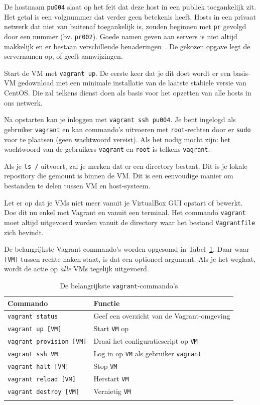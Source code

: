 De hostnaam \texttt{pu004} slaat op het feit dat deze host in een publiek toegankelijk zit. Het getal is een volgnummer dat verder geen betekenis heeft. Hosts in een privaat netwerk dat niet van buitenaf toegankelijk is, zouden beginnen met \texttt{pr} gevolgd door een nummer (bv. \texttt{pr002}). Goede namen geven aan servers is niet altijd makkelijk en er bestaan verschillende benaderingen~\autocite{Mytton2015,mnxio}. De gekozen opgave legt de servernamen op, of geeft aanwijzingen.

Start de VM met \texttt{vagrant\ up}. De eerste keer dat je dit doet wordt er een basis-VM gedownload met een minimale installatie van de laatste stabiele versie van CentOS. Die zal telkens dienst doen als basis voor het opzetten van alle hosts in ons netwerk.

Na opstarten kan je inloggen met \texttt{vagrant\ ssh\ pu004}. Je bent ingelogd als gebruiker \texttt{vagrant} en kan commando's uitvoeren met \texttt{root}-rechten door er \texttt{sudo} voor te plaatsen (geen wachtwoord vereist). Als het nodig mocht zijn: het wachtwoord van de gebruikers \texttt{vagrant} en \texttt{root} is telkens \texttt{vagrant}.

Als je \texttt{ls\ /} uitvoert, zal je merken dat er een directory  bestaat. Dit is je lokale repository die gemount is binnen de VM. Dit is een eenvoudige manier om bestanden te delen tussen VM en host-systeem.

Let er op dat je VMs niet meer vanuit je VirtualBox GUI opstart of bewerkt. Doe dit nu enkel met Vagrant en vanuit een terminal. Het commando \texttt{vagrant} moet altijd uitgevoerd worden vanuit de directory waar het bestand \texttt{Vagrantfile} zich bevindt.

De belangrijkste Vagrant commando's worden opgesomd in Tabel~\ref{tab:vagrant-commandos}. Daar waar \texttt{[VM]} tussen rechte haken staat, is dat een optioneel argument. Als je het weglaat, wordt de actie op \emph{alle} VMs tegelijk uitgevoerd.

\begin{longtable}{@{}ll@{}}
  \toprule
  Commando & Functie\tabularnewline
  \midrule
  \endhead
  \texttt{vagrant\ status} & Geef een overzicht van de Vagrant-omgeving\tabularnewline
  \texttt{vagrant\ up\ [VM]} & Start \texttt{VM} op\tabularnewline
  \texttt{vagrant\ provision\ [VM]} & Draai het configuratiescript op \texttt{VM}\tabularnewline
  \texttt{vagrant\ ssh\ VM} & Log in op \texttt{VM} als gebruiker \texttt{vagrant}\tabularnewline
  \texttt{vagrant\ halt\ [VM]} & Stop \texttt{VM}\tabularnewline
  \texttt{vagrant\ reload\ [VM]} & Herstart \texttt{VM}\tabularnewline
  \texttt{vagrant\ destroy\ [VM]} & Vernietig \texttt{VM}\tabularnewline
  \bottomrule
\caption{De belangrijkste \texttt{vagrant}-commando's}
\label{tab:vagrant-commandos}
\end{longtable}


